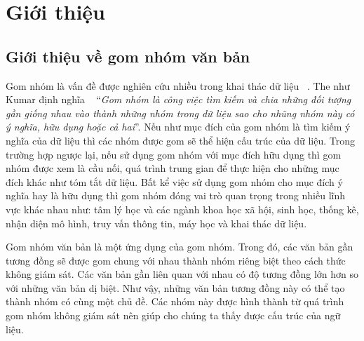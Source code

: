 \chapter{Giới thiệu}
\label{Chapter1}

\section{Giới thiệu về gom nhóm văn bản}

Gom nhóm là vấn đề được nghiên cứu nhiều trong khai thác dữ liệu ~\cite{Jain-Dubes, Jardin-Rijsbergen, Ji-Xu, Jolliffee}.
The như Kumar định nghĩa ~\cite{Vipin-Kumar} ``\textit{Gom nhóm là công việc tìm kiếm và chia những đối tượng gần giống nhau vào thành những nhóm trong dữ liệu sao cho nhũng nhóm này có ý nghĩa, hữu dụng hoặc cả hai}''. %
Nếu như mục đích của gom nhóm là tìm kiếm ý nghĩa của dữ liệu thì các nhóm được gom sẽ thể hiện cấu trúc của dữ liệu.
Trong trường hợp ngược lại, nếu sử dụng gom nhóm với mục đích hữu dụng thì gom nhóm được xem là cầu nối, quá trình trung gian để thực hiện cho những mục đích khác như tóm tắt dữ liệu.
Bất kể việc sử dụng gom nhóm cho mục đích ý nghĩa hay là hữu dụng thì gom nhóm đóng vai trò quan trọng trong nhiều lĩnh vực khác nhau như: tâm lý học và các ngành khoa học xã hội, sinh học, thống kê, nhận diện mô hình, truy vấn thông tin, máy học và khai thác dữ liệu.

Gom nhóm văn bản là một ứng dụng của gom nhóm.
Trong đó, các văn bản gần tương đồng sẽ được gom chung với nhau thành nhóm riêng biệt theo cách thức không giám sát.
Các văn bản gần liên quan với nhau có độ tương đồng lớn hơn so với những văn bản dị biệt.
Như vậy, những văn bản tương đồng này có thể tạo thành nhóm có cùng một chủ đề.
Các nhóm này được hình thành từ quá trình gom nhóm không giám sát nên giúp cho chúng ta thấy được cấu trúc của ngữ liệu.

